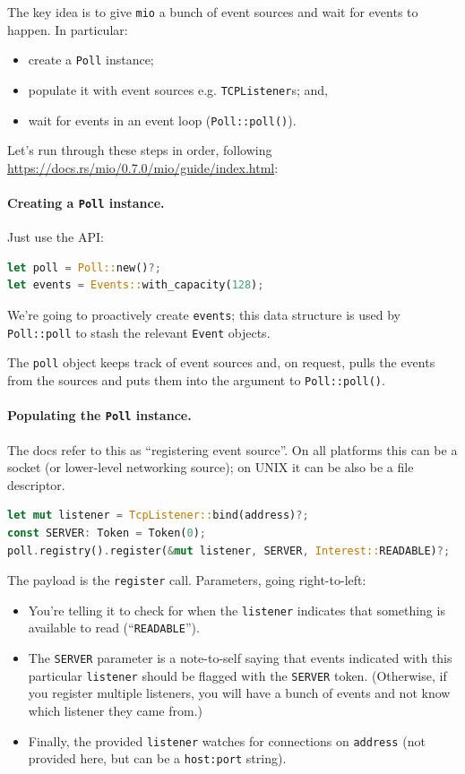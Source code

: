 \documentclass[a4paper]{report}
\begin{document}
The key idea is to give {\tt mio} a bunch of event sources and
wait for events to happen. In particular:
     \begin{itemize}[noitemsep,topsep=-1em]
       \item create a \texttt{Poll} instance;
       \item populate it with event sources e.g. \texttt{TCPListener}s; and,
       \item wait for events in an event loop ({\tt Poll::poll()}).
     \end{itemize}
Let's run through these steps in order, following \url{https://docs.rs/mio/0.7.0/mio/guide/index.html}:

\paragraph{Creating a {\tt Poll} instance.} Just use the API:
    \begin{lstlisting}[language=Rust]
let poll = Poll::new()?;
let events = Events::with_capacity(128);
    \end{lstlisting}
We're going to proactively create \texttt{events}; this data structure is used by
\texttt{Poll::poll} to stash the relevant \texttt{Event} objects.

The \texttt{poll} object keeps track of event sources and,
on request, pulls the events from the sources and puts them
into the argument to \texttt{Poll::poll()}.

\paragraph{Populating the {\tt Poll} instance.} The docs refer
to this as ``registering event source''. On all platforms this can be
a socket (or lower-level networking source); on UNIX it can be also be
a file descriptor.

\begin{lstlisting}[language=Rust]
let mut listener = TcpListener::bind(address)?;
const SERVER: Token = Token(0);
poll.registry().register(&mut listener, SERVER, Interest::READABLE)?;
\end{lstlisting}

The payload is the \texttt{register} call. Parameters, going right-to-left:
\begin{itemize}[noitemsep]
\item You're telling it to check for 
when the \texttt{listener} indicates that something is available to read
(``\texttt{READABLE}'').
\item The \texttt{SERVER} parameter
is a note-to-self saying that events indicated with this particular
\texttt{listener} should be flagged with the \texttt{SERVER} token.
(Otherwise, if you register multiple listeners, you will have a bunch
of events and not know which listener they came from.)
\item Finally, the provided
\texttt{listener} watches for connections on \texttt{address} (not provided here,
but can be a \texttt{host:port} string).
\end{itemize}
\end{document}

